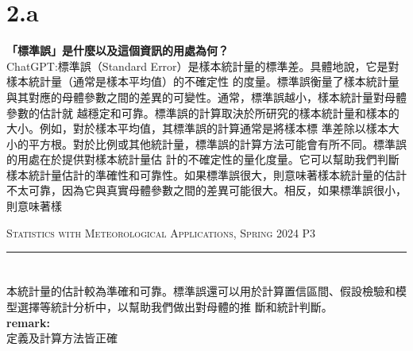 \documentclass{article}
\begin{document}
\begin{CJK*}{UTF8}{bsmi}
\section*{2.a}
\begin{spacing}{2}
    \begin{large}
        \textbf{「標準誤」是什麼以及這個資訊的用處為何？}\\
        ChatGPT:標準誤（Standard Error）是樣本統計量的標準差。具體地說，它是對樣本統計量（通常是樣本平均值）的不確定性
        的度量。標準誤衡量了樣本統計量與其對應的母體參數之間的差異的可變性。通常，標準誤越小，樣本統計量對母體參數的估計就
        越穩定和可靠。標準誤的計算取決於所研究的樣本統計量和樣本的大小。例如，對於樣本平均值，其標準誤的計算通常是將樣本標
        準差除以樣本大小的平方根。對於比例或其他統計量，標準誤的計算方法可能會有所不同。標準誤的用處在於提供對樣本統計量估
        計的不確定性的量化度量。它可以幫助我們判斷樣本統計量估計的準確性和可靠性。如果標準誤很大，則意味著樣本統計量的估計
        不太可靠，因為它與真實母體參數之間的差異可能很大。相反，如果標準誤很小，則意味著樣
    \end{large}
\end{spacing}
        
\newpage
\thispagestyle{empty}
\hfill {\scshape \large Statistics with Meteorological Applications, Spring 2024} \hfill {\scshape P3}
\smallskip
\hrule    

\section*{}
\begin{spacing}{2}
    \begin{large}
        本統計量的估計較為準確和可靠。標準誤還可以用於計算置信區間、假設檢驗和模型選擇等統計分析中，以幫助我們做出對母體的推
        斷和統計判斷。\\
        \textbf{remark:}\\
        定義及計算方法皆正確
    \end{large}
\end{spacing}


\end{CJK*}
\end{document}
